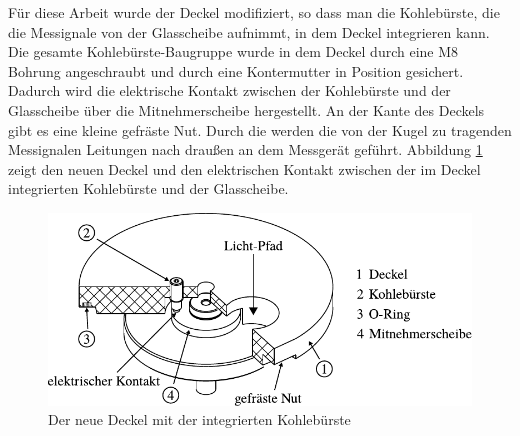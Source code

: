 Für diese Arbeit wurde der Deckel modifiziert, so dass man die Kohlebürste, die die Messignale von der Glasscheibe aufnimmt, in dem Deckel integrieren kann.
Die gesamte Kohlebürste-Baugruppe wurde in dem Deckel durch eine M8 Bohrung angeschraubt und durch eine Kontermutter in Position gesichert.
Dadurch wird die elektrische Kontakt zwischen der Kohlebürste und der Glasscheibe über die Mitnehmerscheibe hergestellt.
An der Kante des Deckels gibt es eine kleine gefräste Nut.
Durch die werden die von der Kugel zu tragenden Messignalen Leitungen nach draußen an dem Messgerät geführt.
Abbildung \ref{fig:deckel_mit_kohlebuersten} zeigt den neuen Deckel und den elektrischen Kontakt zwischen der im Deckel integrierten Kohlebürste und der Glasscheibe.
\begin{figure}[htb]
    \centering
    \includegraphics[]{./images/deckel_und_scheibe.pdf}
    \caption{Der neue Deckel mit der integrierten Kohlebürste}
    \label{fig:deckel_mit_kohlebuersten}
\end{figure}
%
